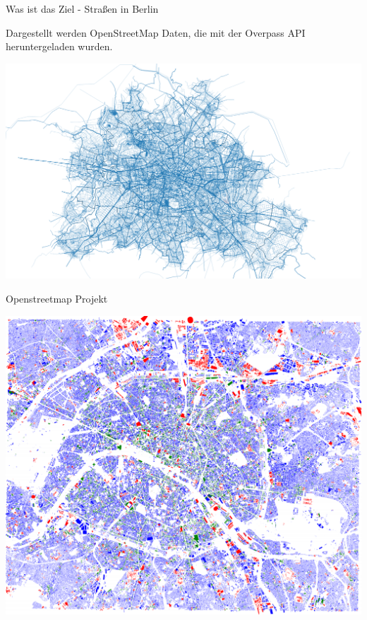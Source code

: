\documentclass[ignorenonframetext,]{beamer}
\begin{document}
\begin{frame}{Was ist das Ziel - Straßen in Berlin}

Dargestellt werden OpenStreetMap Daten, die mit der Overpass API
heruntergeladen wurden.

\includegraphics{figure/streets_Berlin2.png}

\end{frame}

\begin{frame}{Openstreetmap Projekt}

\includegraphics{figure/Buldings_Paris.PNG}

\end{frame}
\end{document}
